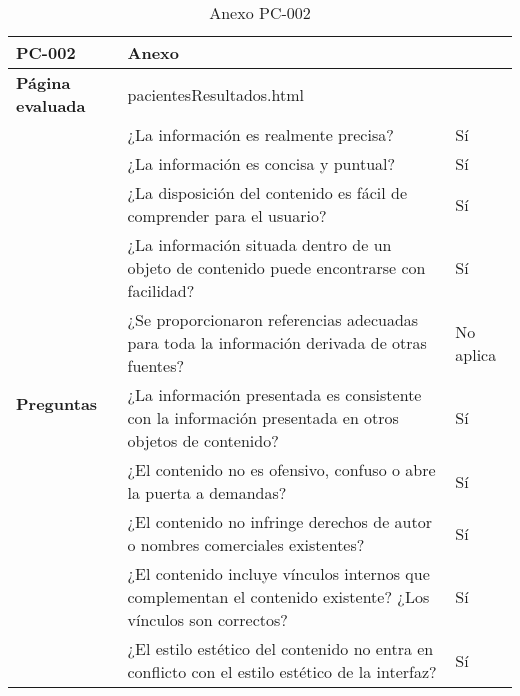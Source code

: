 \begin{table}[htpb]
\centering
\begin{tabularx}{\textwidth}{|l|X|l|}
\hline
\rowcolor[gray]{0.9}\textbf{PC-002}                       & \multicolumn{2}{l|}{Anexo}                                                                                                \\ \hline
\textbf{Página evaluada}             & \multicolumn{2}{l|}{pacientesResultados.html}                                                                             \\ \hline
\multirow{10}{*}{\textbf{Preguntas}} & ¿La información es realmente precisa?                                                                         & Sí        \\ \cline{2-3} 
                                     & ¿La información es concisa y puntual?                                                                         & Sí        \\ \cline{2-3} 
                                     & ¿La disposición del contenido es fácil de comprender para el usuario?                                         & Sí        \\ \cline{2-3} 
                                     & ¿La información situada dentro de un objeto de contenido puede encontrarse con facilidad?                     & Sí        \\ \cline{2-3} 
                                     & ¿Se proporcionaron referencias adecuadas para toda la información derivada de otras fuentes?                  & No aplica \\ \cline{2-3} 
                                     & ¿La información presentada es consistente con la información presentada en otros objetos de contenido?        & Sí        \\ \cline{2-3} 
                                     & ¿El contenido no es ofensivo, confuso o abre la puerta a demandas?                                            & Sí        \\ \cline{2-3} 
                                     & ¿El contenido no infringe derechos de autor o nombres comerciales existentes?                                 & Sí        \\ \cline{2-3} 
                                     & ¿El contenido incluye vínculos internos que complementan el contenido existente? ¿Los vínculos son correctos? & Sí        \\ \cline{2-3} 
                                     & ¿El estilo estético del contenido no entra en conflicto con el estilo estético de la interfaz?                & Sí        \\ \hline
\end{tabularx}
\caption{Anexo PC-002}
\end{table}

